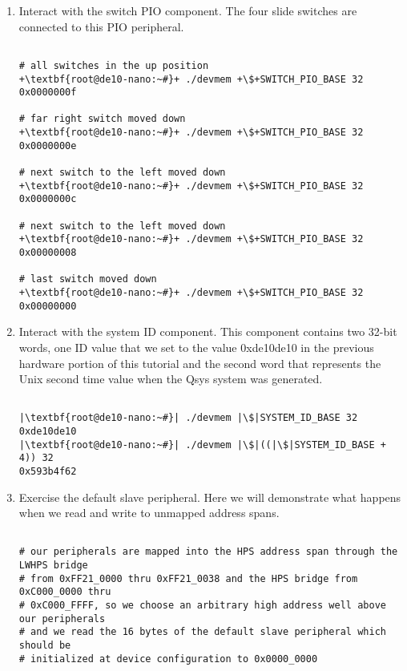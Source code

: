 \begin{flushleft}
\begin{enumerate}[
	label=\textbf{Step \arabic*.},
	leftmargin=*,
	widest={00},
	align=left]
\begin{enumerate}[
	label=\textbf{Step \arabic{enumi}\alph*.},
	leftmargin=*,
	align=left]
\begin{verbatim}
# read the button with KEY1 not pressed
+\textbf{root@de10-nano:~#}+ ./devmem +\$+BUTTON_PIO_BASE 32
0x00000001

\end{verbatim}

\item Interact with the switch PIO component.  The four slide switches are connected to this PIO peripheral.

\begin{verbatim}

# all switches in the up position
+\textbf{root@de10-nano:~#}+ ./devmem +\$+SWITCH_PIO_BASE 32
0x0000000f

# far right switch moved down
+\textbf{root@de10-nano:~#}+ ./devmem +\$+SWITCH_PIO_BASE 32
0x0000000e

# next switch to the left moved down
+\textbf{root@de10-nano:~#}+ ./devmem +\$+SWITCH_PIO_BASE 32
0x0000000c

# next switch to the left moved down
+\textbf{root@de10-nano:~#}+ ./devmem +\$+SWITCH_PIO_BASE 32
0x00000008

# last switch moved down
+\textbf{root@de10-nano:~#}+ ./devmem +\$+SWITCH_PIO_BASE 32
0x00000000

\end{verbatim}

\item Interact with the system ID component.  This component contains two 32-bit words, one ID value that we set to the value 0xde10de10 in the previous hardware portion of this tutorial and the second word that represents the Unix second time value when the Qsys system was generated.

\begin{verbatim}

|\textbf{root@de10-nano:~#}| ./devmem |\$|SYSTEM_ID_BASE 32
0xde10de10
|\textbf{root@de10-nano:~#}| ./devmem |\$|((|\$|SYSTEM_ID_BASE + 4)) 32
0x593b4f62

\end{verbatim}

\item Exercise the default slave peripheral.  Here we will demonstrate what happens when we read and write to unmapped address spans.

\begin{verbatim}

# our peripherals are mapped into the HPS address span through the LWHPS bridge
# from 0xFF21_0000 thru 0xFF21_0038 and the HPS bridge from 0xC000_0000 thru
# 0xC000_FFFF, so we choose an arbitrary high address well above our peripherals
# and we read the 16 bytes of the default slave peripheral which should be
# initialized at device configuration to 0x0000_0000


\end{verbatim}
\end{enumerate}
\end{enumerate}
\end{flushleft}
